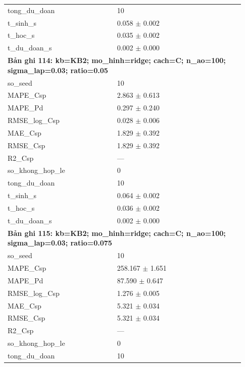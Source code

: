 \begin{longtable}{p{0.43\linewidth}p{0.50\linewidth}}
tong\_\allowbreak du\_\allowbreak doan & 10 \\
t\_\allowbreak sinh\_\allowbreak s & 0.058 $\pm$ 0.002 \\
t\_\allowbreak hoc\_\allowbreak s & 0.035 $\pm$ 0.002 \\
t\_\allowbreak du\_\allowbreak doan\_\allowbreak s & 0.002 $\pm$ 0.000 \\
\midrule
\multicolumn{2}{p{0.95\linewidth}}{\textbf{Bản ghi 114: kb=KB2; mo\_hinh=ridge; cach=C; n\_ao=100; sigma\_lap=0.03; ratio=0.05}} \\
so\_\allowbreak seed & 10 \\
MAPE\_\allowbreak Csp & 2.863 $\pm$ 0.613 \\
MAPE\_\allowbreak Pd & 0.297 $\pm$ 0.240 \\
RMSE\_\allowbreak log\_\allowbreak Csp & 0.028 $\pm$ 0.006 \\
MAE\_\allowbreak Csp & 1.829 $\pm$ 0.392 \\
RMSE\_\allowbreak Csp & 1.829 $\pm$ 0.392 \\
R2\_\allowbreak Csp & — \\
so\_\allowbreak khong\_\allowbreak hop\_\allowbreak le & 0 \\
tong\_\allowbreak du\_\allowbreak doan & 10 \\
t\_\allowbreak sinh\_\allowbreak s & 0.064 $\pm$ 0.002 \\
t\_\allowbreak hoc\_\allowbreak s & 0.036 $\pm$ 0.002 \\
t\_\allowbreak du\_\allowbreak doan\_\allowbreak s & 0.002 $\pm$ 0.000 \\
\midrule
\multicolumn{2}{p{0.95\linewidth}}{\textbf{Bản ghi 115: kb=KB2; mo\_hinh=ridge; cach=C; n\_ao=100; sigma\_lap=0.03; ratio=0.075}} \\
so\_\allowbreak seed & 10 \\
MAPE\_\allowbreak Csp & 258.167 $\pm$ 1.651 \\
MAPE\_\allowbreak Pd & 87.590 $\pm$ 0.647 \\
RMSE\_\allowbreak log\_\allowbreak Csp & 1.276 $\pm$ 0.005 \\
MAE\_\allowbreak Csp & 5.321 $\pm$ 0.034 \\
RMSE\_\allowbreak Csp & 5.321 $\pm$ 0.034 \\
R2\_\allowbreak Csp & — \\
so\_\allowbreak khong\_\allowbreak hop\_\allowbreak le & 0 \\
tong\_\allowbreak du\_\allowbreak doan & 10 \\

\end{longtable}
